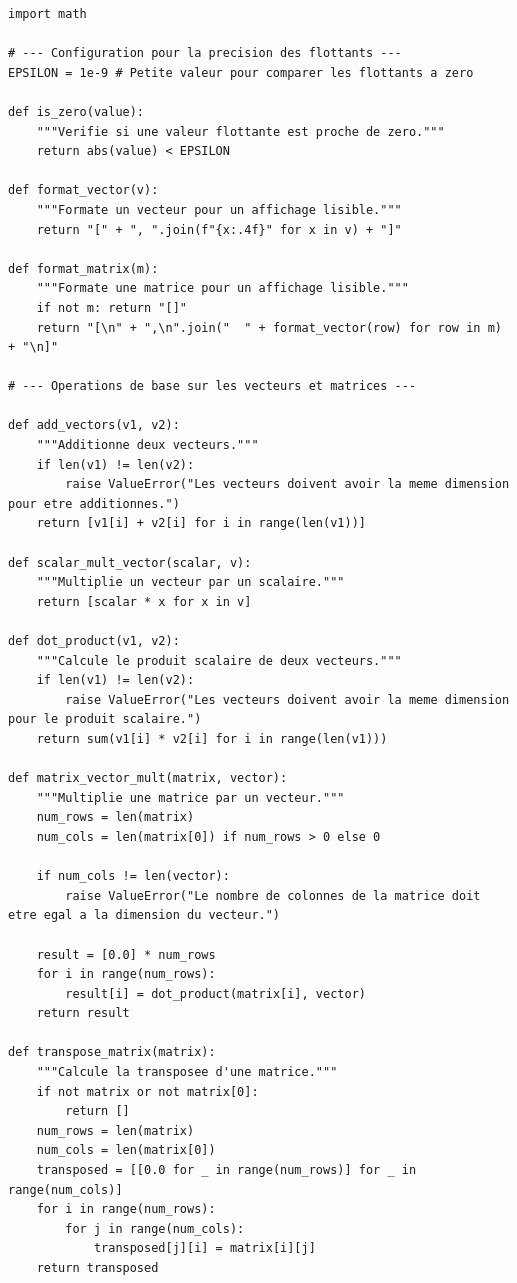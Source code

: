 \documentclass{report}
\begin{document}
\begin{verbatim}
import math

# --- Configuration pour la precision des flottants ---
EPSILON = 1e-9 # Petite valeur pour comparer les flottants a zero

def is_zero(value):
    """Verifie si une valeur flottante est proche de zero."""
    return abs(value) < EPSILON

def format_vector(v):
    """Formate un vecteur pour un affichage lisible."""
    return "[" + ", ".join(f"{x:.4f}" for x in v) + "]"

def format_matrix(m):
    """Formate une matrice pour un affichage lisible."""
    if not m: return "[]"
    return "[\n" + ",\n".join("  " + format_vector(row) for row in m) + "\n]"

# --- Operations de base sur les vecteurs et matrices ---

def add_vectors(v1, v2):
    """Additionne deux vecteurs."""
    if len(v1) != len(v2):
        raise ValueError("Les vecteurs doivent avoir la meme dimension pour etre additionnes.")
    return [v1[i] + v2[i] for i in range(len(v1))]

def scalar_mult_vector(scalar, v):
    """Multiplie un vecteur par un scalaire."""
    return [scalar * x for x in v]

def dot_product(v1, v2):
    """Calcule le produit scalaire de deux vecteurs."""
    if len(v1) != len(v2):
        raise ValueError("Les vecteurs doivent avoir la meme dimension pour le produit scalaire.")
    return sum(v1[i] * v2[i] for i in range(len(v1)))

def matrix_vector_mult(matrix, vector):
    """Multiplie une matrice par un vecteur."""
    num_rows = len(matrix)
    num_cols = len(matrix[0]) if num_rows > 0 else 0

    if num_cols != len(vector):
        raise ValueError("Le nombre de colonnes de la matrice doit etre egal a la dimension du vecteur.")

    result = [0.0] * num_rows
    for i in range(num_rows):
        result[i] = dot_product(matrix[i], vector)
    return result

def transpose_matrix(matrix):
    """Calcule la transposee d'une matrice."""
    if not matrix or not matrix[0]:
        return []
    num_rows = len(matrix)
    num_cols = len(matrix[0])
    transposed = [[0.0 for _ in range(num_rows)] for _ in range(num_cols)]
    for i in range(num_rows):
        for j in range(num_cols):
            transposed[j][i] = matrix[i][j]
    return transposed


\end{verbatim}
\end{document}
